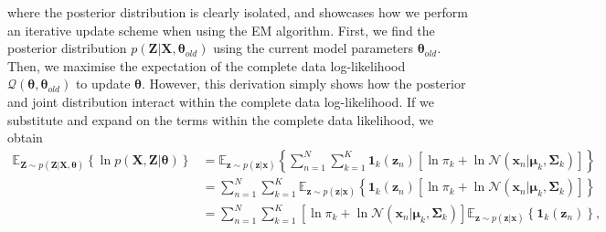 \documentclass{article}
\begin{document}
where the posterior distribution is clearly isolated, and showcases how we perform an iterative update scheme when using the EM algorithm. First, we find the posterior distribution $p(\mathbf{Z}\vert\mathbf{X}, \boldsymbol\theta_{old})$ using the current model parameters $\boldsymbol\theta_{old}$. Then, we maximise the expectation of the complete data log-likelihood $\mathcal{Q}(\boldsymbol\theta, \boldsymbol\theta_{old})$ to update $\boldsymbol\theta$. However, this derivation simply shows how the posterior and joint distribution interact within the complete data log-likelihood. If we substitute and expand on the terms within the complete data likelihood, we obtain
\begin{equation}
\begin{aligned}
\mathbb{E}_{\mathbf{Z} \sim p(\mathbf{Z}\vert\mathbf{X}, \boldsymbol\theta)} \left\lbrace \ln p(\mathbf{X}, \mathbf{Z} \vert \boldsymbol\theta) \right\rbrace &= \mathbb{E}_{\mathbf{z} \sim p(\mathbf{z}\vert\mathbf{x})} \left\lbrace \sum_{n=1}^{N} \sum_{k=1}^{K} \mathbf{1}_k(\mathbf{z}_n) \left[ \ln \pi_k + \ln \mathcal{N}(\mathbf{x}_n \vert \boldsymbol\mu_k, \boldsymbol\Sigma_k) \right] \right\rbrace \\
&= \sum_{n=1}^{N} \sum_{k=1}^{K} \mathbb{E}_{\mathbf{z} \sim p(\mathbf{z}\vert\mathbf{x})} \left\lbrace \mathbf{1}_k(\mathbf{z}_n) \left[ \ln \pi_k + \ln \mathcal{N}(\mathbf{x}_n \vert \boldsymbol\mu_k, \boldsymbol\Sigma_k) \right] \right\rbrace \\
&= \sum_{n=1}^{N} \sum_{k=1}^{K}  \left[ \ln \pi_k + \ln \mathcal{N}(\mathbf{x}_n \vert \boldsymbol\mu_k, \boldsymbol\Sigma_k) \right] \mathbb{E}_{\mathbf{z} \sim p(\mathbf{z}\vert\mathbf{x})} \left\lbrace \mathbf{1}_k(\mathbf{z}_n) \right\rbrace,
\end{aligned}
\end{equation}
\end{document}
